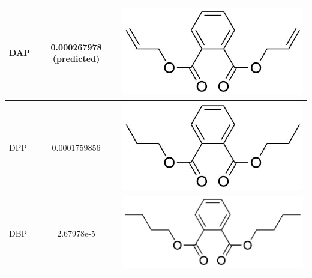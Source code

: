 \begin{table}
\begin{tabular}{lcc}
DAP &   0.000267978 (predicted) &  \begin{minipage}[c]{0.35\linewidth}\centering
\includegraphics[height=0.07\textheight]{pics/PH/DAP_struct2.png}\end{minipage}\\ \midrule
DPP &   0.0001759856 &  \begin{minipage}[c]{0.35\linewidth}\centering
\includegraphics[height=0.07\textheight]{pics/PH/DPP_struct2.png}\end{minipage}\\ \midrule
DBP &   2.67978e-5 &  \begin{minipage}[c]{0.35\linewidth}\centering
\includegraphics[height=0.07\textheight]{pics/PH/DBP_struct2.png}\end{minipage}\\ \midrule

\end{tabular}
\end{table}
